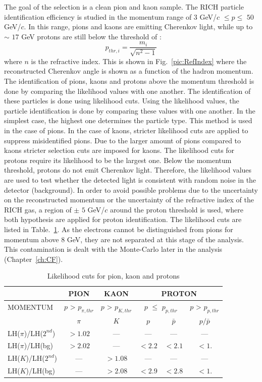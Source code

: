 The goal of the selection is a clean pion and kaon sample. The RICH particle identification efficiency is studied in the momentum range of $3$ GeV/$c$ $ \leq p \leq $ $50$ GeV/$c$. In this range, pions and kaons are emitting Cherenkov light, while up to $\sim$ $17$ GeV protons are still below the threshold of :
%
\begin{equation}
  p_{thr,i} = \frac{m_i}{ \sqrt{n^{2}-1} }
\end{equation}
%
where $n$ is the refractive index. This is shown in Fig.~\ref{pic:RefIndex} where the reconstructed Cherenkov angle is shown as a function of the hadron momentum. The identification of pions, kaons and protons above the momentum threshold is done by comparing the likelihood values with one another. The identification of these particles is done using likelihood cuts. Using the likelihood values, the particle identification is done by comparing these values with one another. In the simplest case, the highest one determines the particle type. This method is used in the case of pions. In the case of kaons, stricter likelihood cuts are applied to suppress misidentified pions. Due to the larger amount of pions compared to kaons stricter selection cuts are imposed for kaons. The likelihood cuts for protons require its likelihood to be the largest one.  Below the momentum threshold, protons do not emit Cherenkov light. Therefore, the likelihood values are used to test whether the detected light is consistent with random noise in the detector (background). In order to avoid possible problems due to the uncertainty on the reconstructed momentum or the uncertainty of the refractive index of the RICH gas, a region of $\pm$ $5$ GeV/$c$ around the proton threshold is used, where both hypothesis are applied for proton identification. The likelihood cuts are listed in Table.~\ref{tab:LHcut}. As the electrons cannot be distinguished from pions for momentum above $8$ GeV, they are not separated at this stage of the analysis. This contamination is dealt with the Monte-Carlo later in the analysis (Chapter~\ref{ch:CF}).

\begin{table}[!h]
  \caption{Likelihood cuts for pion, kaon and protons}
  \label{tab:LHcut}
  \centering
  \begin{tabular}{lccccc}
    \hline
     & PION & KAON & \multicolumn{3}{c}{PROTON} \\
    \hline
    MOMENTUM & $p$ > $p_{\pi,thr}$ & $p$ > $p_{K,thr}$ & \multicolumn{2}{c}{$p$ $\leq$ $p_{p,thr}$} & $p$ > $p_{p,thr}$ \\
     & $\pi$ & $K$ & $p$ & $\bar{p}$ & $p/\bar{p}$ \\
    LH($\pi$)/LH($2^{nd}$) & $> 1.02$ & --- & --- & --- & --- \\
    LH($\pi$)/LH(bg) & $> 2.02$ & --- & $< 2.2$ & $< 2.1$ & $< 1.$\\
    LH($K$)/LH($2^{nd}$) & --- & $> 1.08$ & --- & --- & --- \\
    LH($K$)/LH(bg) & --- & $> 2.08$ & $< 2.9$ & $< 2.8$ & $< 1.$ \\
    \hline
  \end{tabular}
\end{table}

